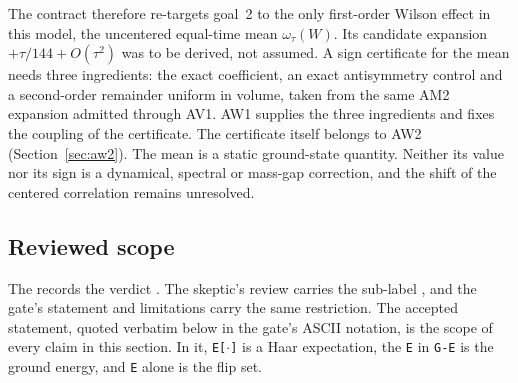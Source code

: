 The contract therefore re-targets goal~2 to the only first-order Wilson effect
in this model, the uncentered equal-time mean $\omega_\tau(W)$. Its candidate
expansion $+\tau/144+O(\tau^2)$ was to be derived, not assumed. A sign
certificate for the mean needs three ingredients: the exact coefficient, an
exact antisymmetry control and a second-order remainder uniform in volume,
taken from the same AM2 expansion admitted through AV1. AW1 supplies the three
ingredients and fixes the coupling of the certificate. The certificate itself
belongs to AW2 (Section~\ref{sec:aw2}). The mean is a static ground-state
quantity. Neither its value nor its sign is a dynamical, spectral or mass-gap
correction, and the shift of the centered correlation remains unresolved.

\subsection{Reviewed scope}
The  records the
verdict . The skeptic's review carries the
sub-label , and the gate's statement and limitations
carry the same restriction. The accepted statement, quoted verbatim below in
the gate's ASCII notation, is the scope of every claim in this section. In it,
\texttt{E[$\cdot$]} is a Haar expectation, the \texttt{E} in \texttt{G-E} is
the ground energy, and \texttt{E} alone is the flip set.
